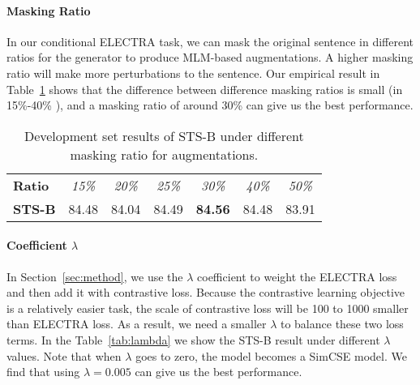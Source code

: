 \documentclass[11pt]{article}
\begin{document}
\paragraph{Masking Ratio}

In our conditional ELECTRA task, we can mask the original sentence in different ratios for the generator to produce MLM-based augmentations. A higher masking ratio will make more perturbations to the sentence. Our empirical result in Table~\ref{tab:mask} shows that the difference between difference masking ratios is small (in 15\%-40\% ), and a masking ratio of around 30\% can give us the best performance.






\begin{table}[t!]
    \begin{center}
    \centering
    \small
    \begin{tabular}{lp{0.6cm}p{0.6cm}p{0.6cm}p{0.6cm}p{0.6cm}p{0.6cm}}
    \toprule
        \bf Ratio & \multicolumn{1}{c}{\it 15\%} & \multicolumn{1}{c}{\it 20\%} & \multicolumn{1}{c}{\it 25\%} & \multicolumn{1}{c}{\it 30\%} & \multicolumn{1}{c}{\it 40\%} & \multicolumn{1}{c}{\it 50\%} \\
        \bf STS-B & 84.48 & 84.04 & 84.49 & \bf 84.56 & 84.48 & 83.91 \\
    \bottomrule
    \end{tabular}
    \end{center}
\vspace{-3mm}
    \caption{
        Development set results of STS-B under different masking ratio for augmentations. 
    }
    \label{tab:mask}
\vspace{-3mm}
\end{table}


\paragraph{Coefficient $\lambda$}

In Section~\ref{sec:method}, we use the $\lambda$ coefficient to weight the ELECTRA loss and then add it with contrastive loss. Because the contrastive learning objective is a relatively easier task, the scale of contrastive loss will be 100 to 1000 smaller than ELECTRA loss. As a result, we need a smaller $\lambda$ to balance these two loss terms. In the Table~\ref{tab:lambda} we show the STS-B result under different $\lambda$ values. Note that when $\lambda$ goes to zero, the model becomes a SimCSE model. We find that using $\lambda=0.005$ can give us the best performance.
\end{document}
